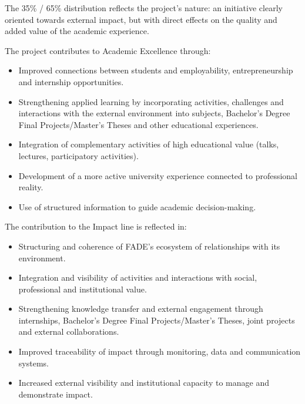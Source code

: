 \documentclass[11pt,a4paper]{scrreprt}
\begin{document}
The 35\% / 65\% distribution reflects the project's nature: an initiative clearly oriented towards external impact, but with direct effects on the quality and added value of the academic experience.



\small
The project contributes to Academic Excellence through:

\begin{itemize}[noitemsep,topsep=2pt]
\item Improved connections between students and employability, entrepreneurship and internship opportunities.
\item Strengthening applied learning by incorporating activities, challenges and interactions with the external environment into subjects, Bachelor's Degree Final Projects/Master's Theses and other educational experiences.
\item Integration of complementary activities of high educational value (talks, lectures, participatory activities).
\item Development of a more active university experience connected to professional reality.
\item Use of structured information to guide academic decision-making.
\end{itemize}



\small
The contribution to the Impact line is reflected in:

\begin{itemize}[noitemsep,topsep=2pt]
\item Structuring and coherence of FADE's ecosystem of relationships with its environment.
\item Integration and visibility of activities and interactions with social, professional and institutional value.
\item Strengthening knowledge transfer and external engagement through internships, Bachelor's Degree Final Projects/Master's Theses, joint projects and external collaborations.
\item Improved traceability of impact through monitoring, data and communication systems.
\item Increased external visibility and institutional capacity to manage and demonstrate impact.
\end{itemize}
\newpage
{}
\end{document}

